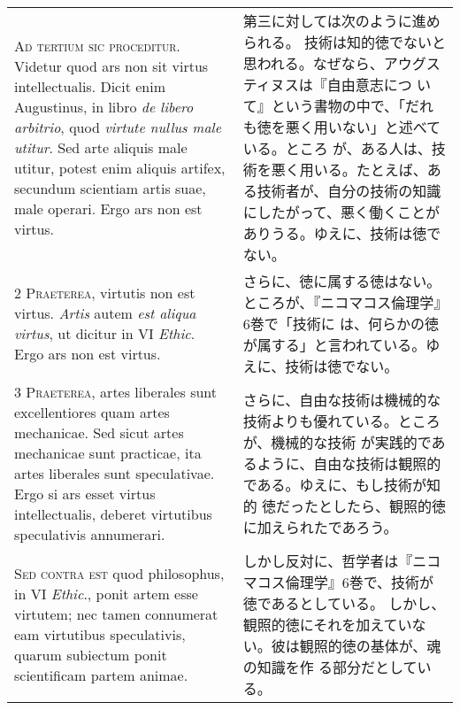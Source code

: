 \documentclass[10pt]{jsarticle} %
\begin{document}
\begin{longtable}{p{21em}p{21em}}

{\huge A}{\scshape d tertium sic proceditur}. Videtur quod ars non sit
 virtus intellectualis. Dicit enim Augustinus, in libro {\itshape de
 libero arbitrio}, quod {\itshape virtute nullus male utitur}. Sed arte
 aliquis male utitur, potest enim aliquis artifex, secundum scientiam
 artis suae, male operari. Ergo ars non est virtus.

&
第三に対しては次のように進められる。
技術は知的徳でないと思われる。なぜなら、アウグスティヌスは『自由意志につ
 いて』という書物の中で、「だれも徳を悪く用いない」と述べている。ところ
 が、ある人は、技術を悪く用いる。たとえば、ある技術者が、自分の技術の知識
 にしたがって、悪く働くことがありうる。ゆえに、技術は徳でない。


\\


{\scshape 2 Praeterea}, virtutis non est virtus. {\itshape Artis} autem
 {\itshape est aliqua virtus}, ut dicitur in VI {\itshape Ethic}. Ergo
 ars non est virtus.

&

さらに、徳に属する徳はない。ところが、『ニコマコス倫理学』6巻で「技術に
 は、何らかの徳が属する」と言われている。ゆえに、技術は徳でない。

\\


{\scshape 3 Praeterea}, artes liberales sunt
 excellentiores quam artes mechanicae. Sed sicut artes mechanicae sunt
 practicae, ita artes liberales sunt speculativae. Ergo si ars esset
 virtus intellectualis, deberet virtutibus speculativis annumerari.

&

さらに、自由な技術は機械的な技術よりも優れている。ところが、機械的な技術
 が実践的であるように、自由な技術は観照的である。ゆえに、もし技術が知的
 徳だったとしたら、観照的徳に加えられたであろう。

\\


{\scshape Sed contra est} quod philosophus, in VI {\itshape Ethic}.,
ponit artem esse virtutem; nec tamen connumerat eam virtutibus
speculativis, quarum subiectum ponit scientificam partem animae.

&

しかし反対に、哲学者は『ニコマコス倫理学』6巻で、技術が徳であるとしている。
 しかし、観照的徳にそれを加えていない。彼は観照的徳の基体が、魂の知識を作
 る部分だとしている。


\end{longtable}
\end{document}
